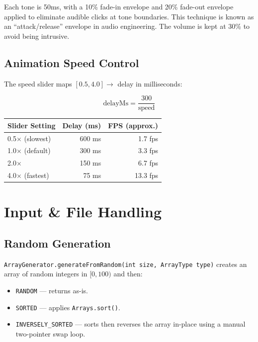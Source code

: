\documentclass[12pt,a4paper]{article}
\begin{document}
Each tone is 50ms, with a 10\% fade-in envelope and 20\% fade-out envelope
applied to eliminate audible clicks at tone boundaries. This technique is known
as an ``attack/release'' envelope in audio engineering. The volume is kept at
30\% to avoid being intrusive.

\subsection{Animation Speed Control}

The speed slider maps $[0.5, 4.0] \to$ delay in milliseconds:

\[
\text{delayMs} = \frac{300}{\text{speed}}
\]

\begin{center}
\begin{tabular}{lrr}
\toprule
\textbf{Slider Setting} & \textbf{Delay (ms)} & \textbf{FPS (approx.)} \\
\midrule
0.5$\times$ (slowest) & 600 ms & 1.7 fps \\
1.0$\times$ (default) & 300 ms & 3.3 fps \\
2.0$\times$           & 150 ms & 6.7 fps \\
4.0$\times$ (fastest) & 75 ms  & 13.3 fps \\
\bottomrule
\end{tabular}
\end{center}

\section{Input \& File Handling}

\subsection{Random Generation}

\texttt{ArrayGenerator.generateFromRandom(int size, ArrayType type)} creates an
array of random integers in $[0, 100)$ and then:

\begin{itemize}[nosep]
    \item \texttt{RANDOM} — returns as-is.
    \item \texttt{SORTED} — applies \texttt{Arrays.sort()}.
    \item \texttt{INVERSELY\_SORTED} — sorts then reverses the array in-place
          using a manual two-pointer swap loop.
\end{itemize}
\end{document}
